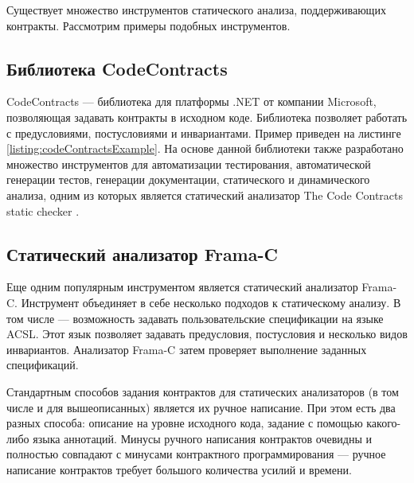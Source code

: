 Существует множество инструментов статического анализа, поддерживающих контракты. Рассмотрим примеры подобных инструментов.

\subsection{Библиотека CodeContracts}
CodeContracts --- библиотека для платформы .NET от компании Microsoft, позволяющая задавать контракты в исходном коде\cite{codeContracts}. Библиотека позволяет работать с предусловиями, постусловиями и инвариантами. Пример приведен на листинге \ref{listing:codeContractsExample}. На основе данной библиотеки также разработано множество инструментов для автоматизации тестирования, автоматической генерации тестов, генерации документации, статического и динамического анализа, одним из которых является статический анализатор The Code Contracts static checker \cite{cccheck}.


\subsection{Статический анализатор Frama-C}
Еще одним популярным инструментом является статический анализатор Frama-C\cite{framaC}. Инструмент объединяет в себе несколько подходов к статическому анализу. В том числе --- возможность задавать пользовательские спецификации на языке ACSL\cite{acsl}. Этот язык позволяет задавать предусловия, постусловия и несколько видов инвариантов. Анализатор Frama-C затем проверяет выполнение заданных спецификаций.


Стандартным способов задания контрактов для статических анализаторов (в том числе и для вышеописанных) является их ручное написание. При этом есть два разных способа: описание на уровне исходного кода, задание с помощью какого-либо языка аннотаций. Минусы ручного написания контрактов очевидны и полностью совпадают с минусами контрактного программирования --- ручное написание контрактов требует большого количества усилий и времени.

